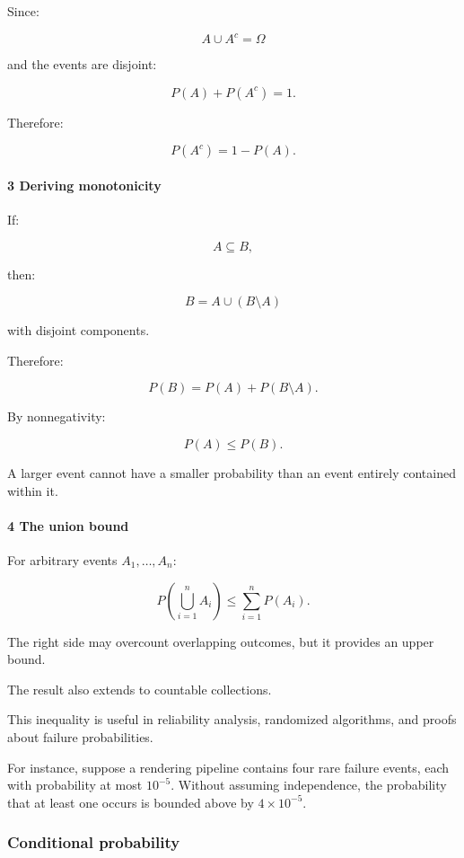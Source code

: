 Since:

\[
 A\cup A^c=\Omega
\]

and the events are disjoint:

\[
 P(A)+P(A^c)=1.
\]

Therefore:

\[
 \boxed{P(A^c)=1-P(A)}.
\]

\paragraph{3 Deriving monotonicity}\label{deriving-monotonicity}

If:

\[
 A\subseteq B,
\]

then:

\[
 B=A\cup(B\setminus A)
\]

with disjoint components.

Therefore:

\[
 P(B)=P(A)+P(B\setminus A).
\]

By nonnegativity:

\[
 \boxed{P(A)\le P(B)}.
\]

A larger event cannot have a smaller probability than an event entirely contained within it.

\paragraph{4 The union bound}\label{the-union-bound}

For arbitrary events \(A_1,\ldots,A_n\):

\[
 \boxed{ P\left(\bigcup_{i=1}^{n}A_i\right) \le \sum_{i=1}^{n}P(A_i) }.
\]

The right side may overcount overlapping outcomes, but it provides an upper bound.

The result also extends to countable collections.

This inequality is useful in reliability analysis, randomized algorithms, and proofs about failure probabilities.

For instance, suppose a rendering pipeline contains four rare failure events, each with probability at most \(10^{-5}\). Without assuming independence, the probability that at least one occurs is bounded above by \(4\times10^{-5}\).

\subsubsection{Conditional probability}\label{conditional-probability}

